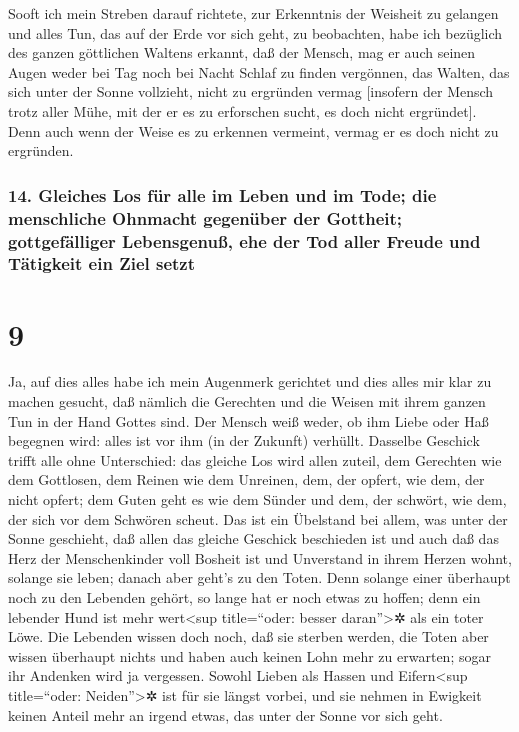 Sooft ich mein Streben darauf richtete, zur Erkenntnis
der Weisheit zu gelangen und alles Tun, das auf der Erde vor sich geht,
zu beobachten, habe ich bezüglich des ganzen göttlichen
Waltens erkannt, daß der Mensch, mag er auch seinen Augen weder bei Tag
noch bei Nacht Schlaf zu finden vergönnen, das Walten, das sich unter
der Sonne vollzieht, nicht zu ergründen vermag {[}insofern der Mensch
trotz aller Mühe, mit der er es zu erforschen sucht, es doch nicht
ergründet{]}. Denn auch wenn der Weise es zu erkennen vermeint, vermag
er es doch nicht zu ergründen.

\hypertarget{gleiches-los-fuxfcr-alle-im-leben-und-im-tode-die-menschliche-ohnmacht-gegenuxfcber-der-gottheit-gottgefuxe4lliger-lebensgenuuxdf-ehe-der-tod-aller-freude-und-tuxe4tigkeit-ein-ziel-setzt}{%
\subsubsection{14. Gleiches Los für alle im Leben und im Tode; die
menschliche Ohnmacht gegenüber der Gottheit; gottgefälliger Lebensgenuß,
ehe der Tod aller Freude und Tätigkeit ein Ziel
setzt}\label{gleiches-los-fuxfcr-alle-im-leben-und-im-tode-die-menschliche-ohnmacht-gegenuxfcber-der-gottheit-gottgefuxe4lliger-lebensgenuuxdf-ehe-der-tod-aller-freude-und-tuxe4tigkeit-ein-ziel-setzt}}

\hypertarget{section-8}{%
\section{9}\label{section-8}}

Ja, auf dies alles habe ich mein Augenmerk gerichtet und
dies alles mir klar zu machen gesucht, daß nämlich die Gerechten und die
Weisen mit ihrem ganzen Tun in der Hand Gottes sind. Der Mensch weiß
weder, ob ihm Liebe oder Haß begegnen wird: alles ist vor ihm (in der
Zukunft) verhüllt. Dasselbe Geschick trifft alle ohne
Unterschied: das gleiche Los wird allen zuteil, dem Gerechten wie dem
Gottlosen, dem Reinen wie dem Unreinen, dem, der opfert, wie dem, der
nicht opfert; dem Guten geht es wie dem Sünder und dem, der schwört, wie
dem, der sich vor dem Schwören scheut. Das ist ein
Übelstand bei allem, was unter der Sonne geschieht, daß allen das
gleiche Geschick beschieden ist und auch daß das Herz der Menschenkinder
voll Bosheit ist und Unverstand in ihrem Herzen wohnt, solange sie
leben; danach aber geht's zu den Toten. Denn solange einer
überhaupt noch zu den Lebenden gehört, so lange hat er noch etwas zu
hoffen; denn ein lebender Hund ist mehr wert\textless sup title=``oder:
besser daran''\textgreater✲ als ein toter Löwe. Die
Lebenden wissen doch noch, daß sie sterben werden, die Toten aber wissen
überhaupt nichts und haben auch keinen Lohn mehr zu erwarten; sogar ihr
Andenken wird ja vergessen. Sowohl Lieben als Hassen und
Eifern\textless sup title=``oder: Neiden''\textgreater✲ ist für sie
längst vorbei, und sie nehmen in Ewigkeit keinen Anteil mehr an irgend
etwas, das unter der Sonne vor sich geht.

